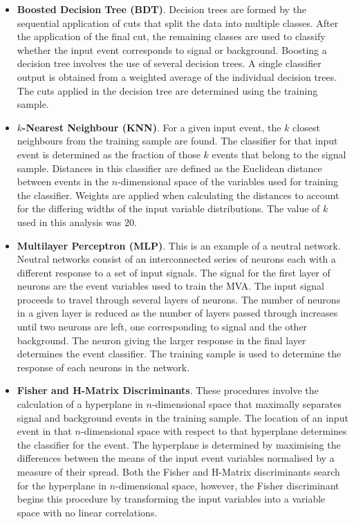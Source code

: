 \begin{itemize}
\item \textbf{Boosted Decision Tree (BDT)}.  Decision trees are formed by the sequential application of cuts that split the data into multiple classes.  After the application of the final cut, the remaining classes are used to classify whether the input event corresponds to signal or background.  Boosting a decision tree involves the use of several decision trees.  A single classifier output is obtained from a weighted average of the individual decision trees.  The cuts applied in the decision tree are determined using the training sample.  
\item \textbf{$k$-Nearest Neighbour (KNN)}.  For a given input event, the $k$ closest neighbours from the training sample are found.  The classifier for that input event is determined as the fraction of those $k$ events that belong to the signal sample.  Distances in this classifier are defined as the Euclidean distance between events in the $n$-dimensional space of the variables used for training the classifier.  Weights are applied when calculating the distances to account for the differing widths of the input variable distributions.  The value of $k$ used in this analysis was 20.
\item \textbf{Multilayer Perceptron (MLP)}.  This is an example of a neutral network.  Neutral networks consist of an interconnected series of neurons each with a different response to a set of input signals.  The signal for the first layer of neurons are the event variables used to train the MVA.  The input signal proceeds to travel through several layers of neurons.  The number of neurons in a given layer is reduced as the number of layers passed through increases until two neurons are left, one corresponding to signal and the other background.  The neuron giving the larger response in the final layer determines the event classifier.  The training sample is used to determine the response of each neurons in the network.
\item \textbf{Fisher and H-Matrix Discriminants}.  These procedures involve the calculation of a hyperplane in $n$-dimensional space that maximally separates signal and background events in the training sample.  The location of an input event in that $n$-dimensional space with respect to that hyperplane determines the classifier for the event.  The hyperplane is determined by maximising the differences between the means of the input event variables normalised by a measure of their spread.  Both the Fisher and H-Matrix discriminants search for the hyperplane in $n$-dimensional space, however, the Fisher discriminant begins this procedure by transforming the input variables into a variable space with no linear correlations.  

\end{itemize}
